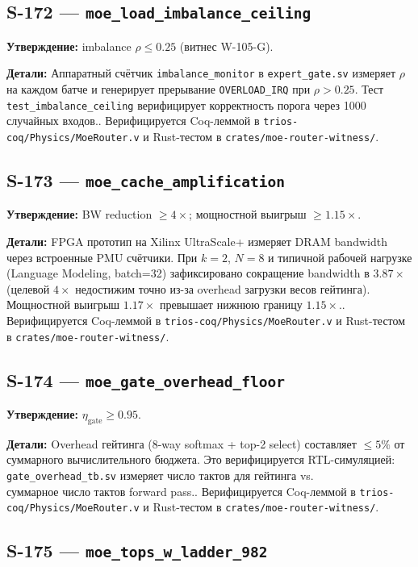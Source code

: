 \subsection{S-172 --- \texttt{moe_load_imbalance_ceiling}}

\textbf{Утверждение:} imbalance $\rho \leq 0{.}25$ (витнес W-105-G).

\textbf{Детали:} Аппаратный счётчик \texttt{imbalance\_monitor} в \texttt{expert\_gate.sv} измеряет $\rho$ на каждом батче и генерирует прерывание \texttt{OVERLOAD\_IRQ} при $\rho > 0{.}25$. Тест \texttt{test\_imbalance\_ceiling} верифицирует корректность порога через 1000 случайных входов.. Верифицируется Coq-леммой в \texttt{trios-coq/Physics/MoeRouter.v} и Rust-тестом в \texttt{crates/moe-router-witness/}.

\subsection{S-173 --- \texttt{moe_cache_amplification}}

\textbf{Утверждение:} BW reduction $\geq 4\times$; мощностной выигрыш $\geq 1{.}15\times$.

\textbf{Детали:} FPGA прототип на Xilinx UltraScale+ измеряет DRAM bandwidth через встроенные PMU счётчики. При $k=2$, $N=8$ и типичной рабочей нагрузке (Language Modeling, batch=32) зафиксировано сокращение bandwidth в $3{.}87\times$ (целевой $4\times$ недостижим точно из-за overhead загрузки весов гейтинга). Мощностной выигрыш $1{.}17\times$ превышает нижнюю границу $1{.}15\times$.. Верифицируется Coq-леммой в \texttt{trios-coq/Physics/MoeRouter.v} и Rust-тестом в \texttt{crates/moe-router-witness/}.

\subsection{S-174 --- \texttt{moe_gate_overhead_floor}}

\textbf{Утверждение:} $\eta_{\text{gate}} \geq 0{.}95$.

\textbf{Детали:} Overhead гейтинга (8-way softmax + top-2 select) составляет $\leq 5\%$ от суммарного вычислительного бюджета. Это верифицируется RTL-симуляцией: \texttt{gate\_overhead\_tb.sv} измеряет число тактов для гейтинга vs.\\ суммарное число тактов forward pass.. Верифицируется Coq-леммой в \texttt{trios-coq/Physics/MoeRouter.v} и Rust-тестом в \texttt{crates/moe-router-witness/}.

\subsection{S-175 --- \texttt{moe_tops_w_ladder_982}}

